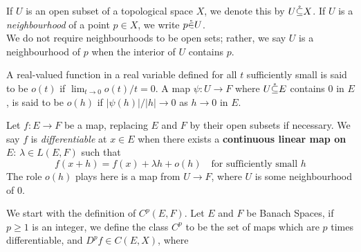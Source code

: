 \documentclass[../main-manifolds.tex]{subfiles}
\begin{document}
\newpage
{}
\begin{definition}\label{def:osub-notation}
    If $U$ is an open subset of a topological space $X$, we denote this by $U\mathring{\subseteq} X$. If $U$ is a \emph{neighbourhood} of a point $p\in X$, we write $p\mathring{\in} U$. \\
    
    We do not require neighbourhoods to be open sets; rather, we say $U$ is a neighbourhood of $p$ when the interior of $U$ contains $p$.
\end{definition}
\begin{definition}[Little $o$]\label{def:little-oh}
    A real-valued function in a real variable defined for all $t$ sufficiently small is said to be \emph{$o(t)$} if $\lim_{t\to 0}o(t)/t=0$. A map $\psi: U\to  F$ where $U\mathring{\subseteq} E$ contains $0$ in $E$, is said to be $o(h)$ if $\vert \psi(h)\vert/\vert h\vert \to 0$ as $h\to 0$ in $E$.
\end{definition}
\begin{definition}[Differentiability]\label{def:differentiability}
    Let $f: E\to F$ be a map, replacing $E$ and $F$ by their open subsets if necessary. We say $f$ is \emph{differentiable} at $x\in E$ when there exists a \textbf{continuous linear map on $E$}: $\lambda\in L(E,F)$ such that
    \begin{equation}\label{eq:differentiability-def}
        f(x+h) = f(x) + \lambda h + o(h)\quad\text{for sufficiently small }h
    \end{equation}
    The role $o(h)$ plays here is a map from $U\to F$, where $U$ is some neighbourhood of $0$. 
\end{definition}
\begin{wts}
    
\end{wts}



\newpage
{}
We start with the definition of $C^p(E,F)$. Let $E$ and $F$ be Banach Spaces, if $p\geq 1$ is an integer, we define the class $C^p$ to be the set of maps which are $p$ times differentiable, and $D^p f\in C(E, X)$, where 
\end{document}
